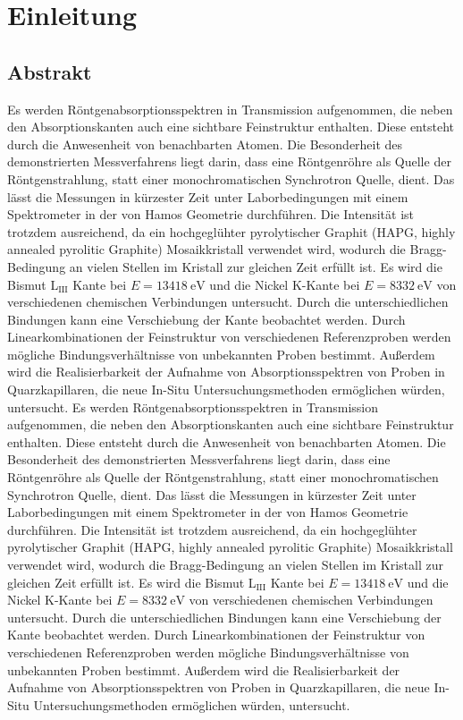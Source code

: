 \chapter{Einleitung}
\section{Abstrakt}
Es werden Röntgenabsorptionsspektren in Transmission aufgenommen, die neben den Absorptionskanten auch eine sichtbare Feinstruktur enthalten. Diese entsteht durch die Anwesenheit von benachbarten Atomen. Die Besonderheit des demonstrierten Messverfahrens liegt darin, dass eine Röntgenröhre als Quelle der Röntgenstrahlung, statt einer monochromatischen Synchrotron Quelle, dient. Das lässt die Messungen in kürzester Zeit unter Laborbedingungen mit einem Spektrometer in der von Hamos Geometrie durchführen. Die Intensität ist trotzdem ausreichend, da ein hochgeglühter pyrolytischer Graphit (HAPG,  highly annealed pyrolitic Graphite) Mosaikkristall verwendet wird, wodurch die Bragg-Bedingung an vielen Stellen im Kristall zur gleichen Zeit erfüllt ist. Es wird die Bismut L$_\mathrm{III}$ Kante bei $E=\SI{13418}{\eV}$ und die Nickel K-Kante bei $E=\SI{8332}{\eV}$ von verschiedenen chemischen Verbindungen untersucht. Durch die unterschiedlichen Bindungen kann eine Verschiebung der Kante beobachtet werden. Durch Linearkombinationen der Feinstruktur von verschiedenen Referenzproben werden mögliche Bindungsverhältnisse von unbekannten Proben bestimmt. Außerdem wird die Realisierbarkeit der Aufnahme von Absorptionsspektren von Proben in Quarzkapillaren, die neue In-Situ Untersuchungsmethoden ermöglichen würden, untersucht.
Es werden Röntgenabsorptionsspektren in Transmission aufgenommen, die neben den Absorptionskanten auch eine sichtbare Feinstruktur enthalten. Diese entsteht durch die Anwesenheit von benachbarten Atomen. Die Besonderheit des demonstrierten Messverfahrens liegt darin, dass eine Röntgenröhre als Quelle der Röntgenstrahlung, statt einer monochromatischen Synchrotron Quelle, dient. Das lässt die Messungen in kürzester Zeit unter Laborbedingungen mit einem Spektrometer in der von Hamos Geometrie durchführen. Die Intensität ist trotzdem ausreichend, da ein hochgeglühter pyrolytischer Graphit (HAPG,  highly annealed pyrolitic Graphite) Mosaikkristall verwendet wird, wodurch die Bragg-Bedingung an vielen Stellen im Kristall zur gleichen Zeit erfüllt ist. Es wird die Bismut L$_\mathrm{III}$ Kante bei $E=\SI{13418}{\eV}$ und die Nickel K-Kante bei $E=\SI{8332}{\eV}$ von verschiedenen chemischen Verbindungen untersucht. Durch die unterschiedlichen Bindungen kann eine Verschiebung der Kante beobachtet werden. Durch Linearkombinationen der Feinstruktur von verschiedenen Referenzproben werden mögliche Bindungsverhältnisse von unbekannten Proben bestimmt. Außerdem wird die Realisierbarkeit der Aufnahme von Absorptionsspektren von Proben in Quarzkapillaren, die neue In-Situ Untersuchungsmethoden ermöglichen würden, untersucht.
